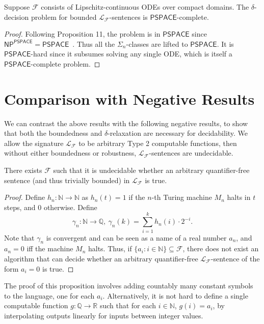 \documentclass[prodmode]{acmsmall} %
\begin{document}
\begin{corollary}
Suppose $\mathcal{F}$ consists of Lipschitz-continuous ODEs over compact domains. The $\delta$-decision problem for bounded $\mathcal{L}_{\mathcal{F}}$-sentences is $\mathsf{PSPACE}$-complete. 
\end{corollary}

\begin{proof}
Following Proposition 11, the problem is in $\mathsf{PSPACE}$ since $\mathsf{NP}^{\mathsf{PSPACE}}=\mathsf{PSPACE}$~\cite{phold}. Thus all the $\Sigma_n$-classes are lifted to $\mathsf{PSPACE}$. It is $\mathsf{PSPACE}$-hard since it subsumes solving any single ODE, which is itself a $\mathsf{PSPACE}$-complete problem.
\end{proof}

\section{Comparison with Negative Results}\label{negative}

We can contrast the above results with the following negative results, to show that both the boundedness and $\delta$-relaxation are necessary for decidability. We allow the signature $\mathcal{L}_{\mathcal{F}}$ to be arbitrary Type 2 computable functions, then without either boundedness or robustness, $\mathcal{L}_{\mathcal{F}}$-sentences are undecidable. 

\begin{proposition}
There exists $\mathcal{F}$ such that it is undecidable whether an arbitrary quantifier-free sentence (and thus trivially bounded) in $\mathcal{L}_{\mathcal{F}}$ is true. 
\end{proposition}

\begin{proof}
Define $h_n: \mathbb{N}\rightarrow \mathbb{N}$ as $h_n(t)=1$ if the $n$-th Turing machine $M_n$ halts in $t$ steps, and 0 otherwise. Define
$$\gamma_n: \mathbb{N}\rightarrow \mathbb{Q},\ \gamma_n(k) = \sum_{i=1}^k h_n(i)\cdot2^{-i}.$$ 
Note that $\gamma_n$ is convergent and can be seen as a name of a real number $a_n$, and $a_n=0$ iff the machine $M_n$ halts. Thus, if $\{a_i:i\in \mathbb{N}\}\subseteq \mathcal{F}$, there does not exist an algorithm that can decide whether an arbitrary quantifier-free $\mathcal{L}_{\mathcal{F}}$-sentence of the form $a_i=0$ is true. 
\end{proof}

The proof of this proposition involves adding countably many constant symbols to the language, one for each $a_i$. Alternatively, it is not hard to define a single computable function $g : \mathbb Q \to \mathbb R$ such that for each $i \in \mathbb N$, $g(i) = a_i$, by interpolating outputs linearly for inputs between integer values.
\end{document}
